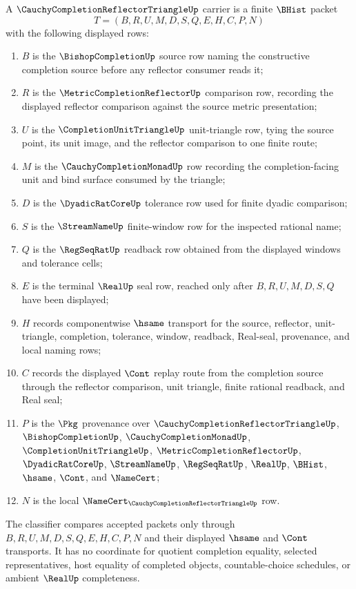 \begin{definition}
\label{def:cauchy-completion-reflector-triangle-carrier}
A $\CauchyCompletionReflectorTriangleUp$ carrier is a finite $\BHist$ packet
$$
T=(B,R,U,M,D,S,Q,E,H,C,P,N)
$$
with the following displayed rows:
\begin{enumerate}
\item $B$ is the $\BishopCompletionUp$ source row naming the constructive completion source before any reflector consumer reads it;
\item $R$ is the $\MetricCompletionReflectorUp$ comparison row, recording the displayed reflector comparison against the source metric presentation;
\item $U$ is the $\CompletionUnitTriangleUp$ unit-triangle row, tying the source point, its unit image, and the reflector comparison to one finite route;
\item $M$ is the $\CauchyCompletionMonadUp$ row recording the completion-facing unit and bind surface consumed by the triangle;
\item $D$ is the $\DyadicRatCoreUp$ tolerance row used for finite dyadic comparison;
\item $S$ is the $\StreamNameUp$ finite-window row for the inspected rational name;
\item $Q$ is the $\RegSeqRatUp$ readback row obtained from the displayed windows and tolerance cells;
\item $E$ is the terminal $\RealUp$ seal row, reached only after $B,R,U,M,D,S,Q$ have been displayed;
\item $H$ records componentwise $\hsame$ transport for the source, reflector, unit-triangle, completion, tolerance, window, readback, Real-seal, provenance, and local naming rows;
\item $C$ records the displayed $\Cont$ replay route from the completion source through the reflector comparison, unit triangle, finite rational readback, and Real seal;
\item $P$ is the $\Pkg$ provenance over $\CauchyCompletionReflectorTriangleUp$, $\BishopCompletionUp$, $\CauchyCompletionMonadUp$, $\CompletionUnitTriangleUp$, $\MetricCompletionReflectorUp$, $\DyadicRatCoreUp$, $\StreamNameUp$, $\RegSeqRatUp$, $\RealUp$, $\BHist$, $\hsame$, $\Cont$, and $\NameCert$;
\item $N$ is the local $\NameCert_{\CauchyCompletionReflectorTriangleUp}$ row.
\end{enumerate}
The classifier compares accepted packets only through $B,R,U,M,D,S,Q,E,H,C,P,N$ and their displayed $\hsame$ and $\Cont$ transports. It has no coordinate for quotient completion equality, selected representatives, host equality of completed objects, countable-choice schedules, or ambient $\RealUp$ completeness.
\end{definition}


